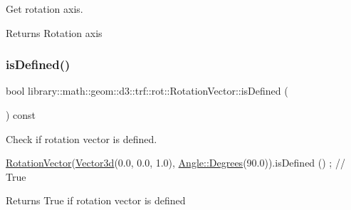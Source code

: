 Get rotation axis. 

\begin{DoxyReturn}{Returns}
Rotation axis 
\end{DoxyReturn}
\mbox{\label{classlibrary_1_1math_1_1geom_1_1d3_1_1trf_1_1rot_1_1_rotation_vector_a1f2c797245926200ab3fd876e8bd1f85}} 
\subsubsection{\texorpdfstring{is\+Defined()}{isDefined()}}
{\footnotesize\ttfamily bool library\+::math\+::geom\+::d3\+::trf\+::rot\+::\+Rotation\+Vector\+::is\+Defined (\begin{DoxyParamCaption}{ }\end{DoxyParamCaption}) const}



Check if rotation vector is defined. 


\begin{DoxyCode}
\hyperlink{classlibrary_1_1math_1_1geom_1_1d3_1_1trf_1_1rot_1_1_rotation_vector_a49076a279f457fdb14c4a9d4d61e1738}{RotationVector}(\hyperlink{namespacelibrary_1_1math_1_1obj_a977e84e9bf317a4e7dd9d6d671d6da2f}{Vector3d}(0.0, 0.0, 1.0), \hyperlink{classlibrary_1_1math_1_1geom_1_1_angle_a64aa53e8420aeb6f671d86c65c370bc8}{Angle::Degrees}(90.0)).isDefined
      () ; \textcolor{comment}{// True}
\end{DoxyCode}


\begin{DoxyReturn}{Returns}
True if rotation vector is defined 
\end{DoxyReturn}
\mbox{\label{classlibrary_1_1math_1_1geom_1_1d3_1_1trf_1_1rot_1_1_rotation_vector_a7b3ba0d46263288d9295f413c2d81e21}} 
